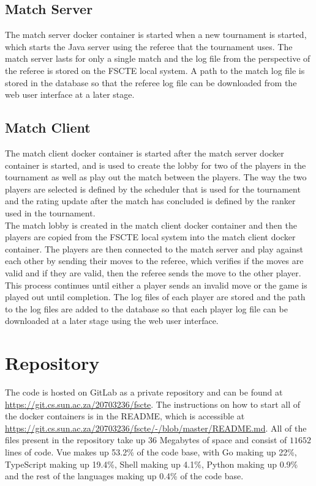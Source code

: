 \documentclass[a4paper, 12pt]{report}
\begin{document}
\subsection{Match Server}

The match server docker container is started when a new tournament is started,
which starts the Java server using the referee that the tournament uses. The match
server lasts for only a single match and the log file from the perspective of the
referee is stored on the FSCTE local system. A path to the match log file is stored
in the database so that the referee log file can be downloaded from the web user
interface at a later stage.

\subsection{Match Client}

The match client docker container is started after the match server docker container
is started, and is used to create the lobby for two of the players in the tournament
as well as play out the match between the players. The way the two players are
selected is defined by the scheduler that is used for the tournament and the
rating update after the match has concluded is defined by the ranker used in the
tournament. \\

The match lobby is created in the match client docker container and then the
players are copied from the FSCTE local system into the match client docker
container. The players are then connected to the match server and play against
each other by sending their moves to the referee, which verifies if the moves are
valid and if they are valid, then the referee sends the move to the other player.
This process continues until either a player sends an invalid move or the game
is played out until completion. The log files of each player are stored and the
path to the log files are added to the database so that each player log file can
be downloaded at a later stage using the web user interface.

\section{Repository}

The code is hosted on GitLab as a private repository and can be found at
\url{https://git.cs.sun.ac.za/20703236/fscte}. The instructions on how to start
all of the docker containers is in the README, which is accessible at
\url{https://git.cs.sun.ac.za/20703236/fscte/-/blob/master/README.md}. All of
the files present in the repository take up 36 Megabytes of space and consist
of $11 652$ lines of code. Vue makes up 53.2\% of the code base, with Go making
up 22\%, TypeScript making up 19.4\%, Shell making up 4.1\%, Python making up
0.9\% and the rest of the languages making up 0.4\% of the code base.
\end{document}
